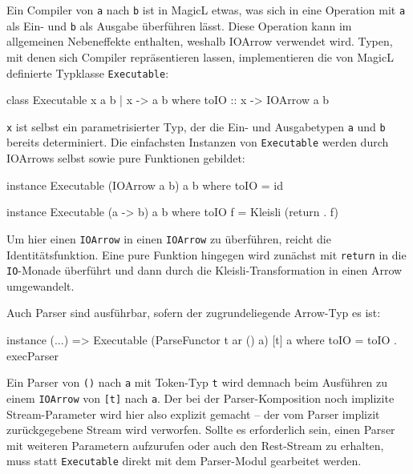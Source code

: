 \documentclass[11pt, a4paper, bibgerm]{scrbook}
\newenvironment{DIFnomarkup}{}{}
\newcommand\icode[1]{\lstinline?#1?}
\begin{document}
Ein Compiler von \icode{a} nach \icode{b} ist in MagicL etwas, was sich
in eine Operation mit \icode{a} als Ein- und \icode{b} als Ausgabe
überführen lässt. Diese Operation kann im allgemeinen Nebeneffekte
enthalten, weshalb IOArrow verwendet wird. Typen, mit denen sich
Compiler repräsentieren lassen, implementieren die von MagicL definierte
Typklasse \icode{Executable}:
\begin{DIFnomarkup}\begin{code}
class Executable x a b | x -> a b where
  toIO :: x -> IOArrow a b
\end{code}\end{DIFnomarkup}
\icode{x} ist selbst ein parametrisierter Typ, der die Ein- und
Ausgabetypen \icode{a} und \icode{b} bereits determiniert. Die einfachsten
Instanzen von \icode{Executable} werden durch IOArrows selbst sowie pure
Funktionen gebildet:
\begin{DIFnomarkup}\begin{code}
instance Executable (IOArrow a b) a b where
  toIO = id

instance Executable (a -> b) a b where
  toIO f = Kleisli (return . f)
\end{code}\end{DIFnomarkup}
Um hier einen \icode{IOArrow} in einen \icode{IOArrow} zu überführen,
reicht die Identitätsfunktion. Eine pure Funktion hingegen wird zunächst
mit \icode{return} in die \icode{IO}-Monade überführt und dann durch die
Kleisli-Transformation in einen Arrow umgewandelt.

Auch Parser sind ausführbar, sofern der zugrundeliegende Arrow-Typ es
ist:
\begin{DIFnomarkup}\begin{code}
instance (...) => Executable (ParseFunctor t ar () a) [t] a where
  toIO = toIO . execParser
\end{code}\end{DIFnomarkup}
Ein Parser von \icode{()} nach \icode{a} mit Token-Typ \icode{t} wird
demnach beim Ausführen zu einem \icode{IOArrow} von \icode{[t]} nach
\icode{a}. Der bei der Parser-Komposition noch implizite
Stream-Parameter wird hier also explizit gemacht -- der vom Parser
implizit zurückgegebene Stream wird verworfen. Sollte es erforderlich
sein, einen Parser mit weiteren Parametern aufzurufen oder auch den
Rest-Stream zu erhalten, muss statt \icode{Executable} direkt mit dem
Parser-Modul gearbeitet werden.
\end{document}
